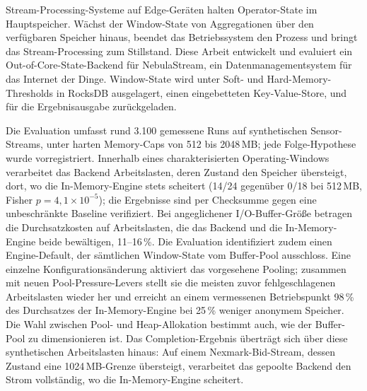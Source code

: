 Stream-Processing-Systeme auf Edge-Ger\"aten halten Operator-State im Hauptspeicher.
W\"achst der Window-State von Aggregationen \"uber den verf\"ugbaren Speicher hinaus, beendet das Betriebssystem den Prozess und bringt das Stream-Processing zum Stillstand.
Diese Arbeit entwickelt und evaluiert ein Out-of-Core-State-Backend f\"ur NebulaStream, ein Datenmanagementsystem f\"ur das Internet der Dinge.
Window-State wird unter Soft- und Hard-Memory-Thresholds in RocksDB ausgelagert, einen eingebetteten Key-Value-Store, und f\"ur die Ergebnisausgabe zur\"uckgeladen.

Die Evaluation umfasst rund 3{.}100 gemessene Runs auf synthetischen Sensor-Streams, unter harten Memory-Caps von 512 bis 2048\,MB; jede Folge-Hypothese wurde vorregistriert.
Innerhalb eines charakterisierten Operating-Windows verarbeitet das Backend Arbeitslasten, deren Zustand den Speicher \"ubersteigt, dort, wo die In-Memory-Engine stets scheitert (14/24 gegen\"uber 0/18 bei 512\,MB, Fisher $p = 4{,}1 \times 10^{-5}$); die Ergebnisse sind per Checksumme gegen eine unbeschr\"ankte Baseline verifiziert.
Bei angeglichener I/O-Buffer-Gr\"o\ss e betragen die Durchsatzkosten auf Arbeitslasten, die das Backend und die In-Memory-Engine beide bew\"altigen, 11--16\,\%.
Die Evaluation identifiziert zudem einen Engine-Default, der s\"amtlichen Window-State vom Buffer-Pool ausschloss.
Eine einzelne Konfigurations\"anderung aktiviert das vorgesehene Pooling; zusammen mit neuen Pool-Pressure-Levers stellt sie die meisten zuvor fehlgeschlagenen Arbeitslasten wieder her und erreicht an einem vermessenen Betriebspunkt 98\,\% des Durchsatzes der In-Memory-Engine bei 25\,\% weniger anonymem Speicher.
Die Wahl zwischen Pool- und Heap-Allokation bestimmt auch, wie der Buffer-Pool zu dimensionieren ist.
Das Completion-Ergebnis \"ubertr\"agt sich \"uber diese synthetischen Arbeitslasten hinaus: Auf einem Nexmark-Bid-Stream, dessen Zustand eine 1024\,MB-Grenze \"ubersteigt, verarbeitet das gepoolte Backend den Strom vollst\"andig, wo die In-Memory-Engine scheitert.

